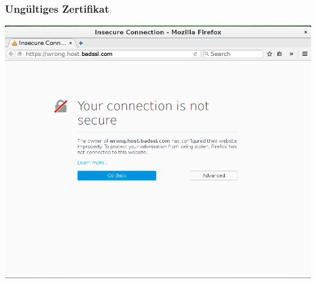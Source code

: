 \begin{frame}
    \frametitle{Ungültiges Zertifikat}
    \begin{center}
	\includegraphics[height=0.7\textheight]{img/ssl_badcert.png}
    \end{center}
\end{frame}
